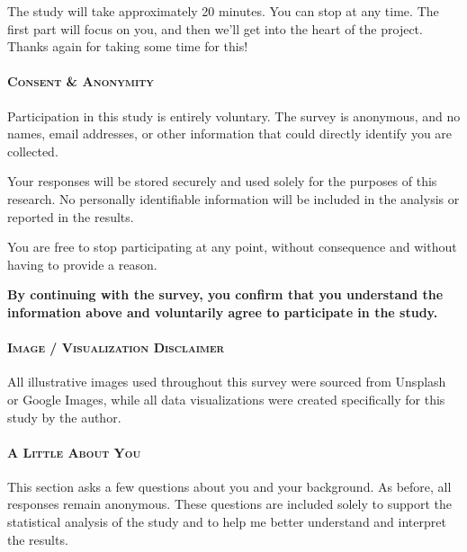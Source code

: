 The study will take approximately 20 minutes. You can stop at any time. The first part will
focus on you, and then we'll get into the heart of the project. Thanks again for taking some
time for this!

\paragraph{\textsc{Consent \& Anonymity}}
Participation in this study is entirely voluntary. The survey is anonymous, and no names,
email addresses, or other information that could directly identify you are collected.

Your responses will be stored securely and used solely for the purposes of this research. No
personally identifiable information will be included in the analysis or reported in the
results.

You are free to stop participating at any point, without consequence and without having to
provide a reason.

\textbf{By continuing with the survey, you confirm that you understand the information above
and voluntarily agree to participate in the study.}

\paragraph{\textsc{Image / Visualization Disclaimer}}
All illustrative images used throughout this survey were sourced from Unsplash or Google
Images, while all data visualizations were created specifically for this study by the author.

\paragraph{\textsc{A Little About You}}
This section asks a few questions about you and your background. As before, all responses
remain anonymous. These questions are included solely to support the statistical analysis of
the study and to help me better understand and interpret the results.

